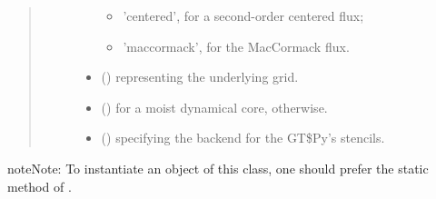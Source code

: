 \documentclass[letterpaper,10pt,english]{sphinxmanual}
\begin{document}
\begin{fulllineitems}
\begin{fulllineitems}
\begin{quote}
\begin{description}
\begin{itemize}
\begin{itemize}
\item {} 
’centered’, for a second-order centered flux;

\item {} 
’maccormack’, for the MacCormack flux.

\end{itemize}


\item {} 
 () \textendash{} {\hyperref[\detokenize{api:grids.grid_xyz.GridXYZ}]{}} representing the underlying grid.

\item {} 
 () \textendash{}  for a moist dynamical core,  otherwise.

\item {} 
 () \textendash{}  specifying the backend for the GT\$Py’s stencils.

\end{itemize}

\end{description}\end{quote}

\begin{sphinxadmonition}{note}{Note:}
To instantiate an object of this class, one should prefer the static method
{\hyperref[\detokenize{api:dycore.prognostic_isentropic.PrognosticIsentropic.factory}]{}} of
{\hyperref[\detokenize{api:dycore.prognostic_isentropic.PrognosticIsentropic}]{}}.
\end{sphinxadmonition}

\end{fulllineitems}



\end{fulllineitems}
\end{document}
